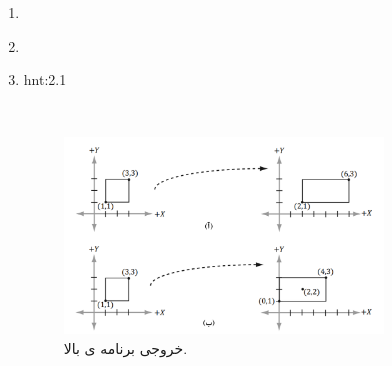 {\begin{spacing}{1.5}
\begin{enumerate}[label=\textbf{\arabic*}.]
            \item {
                 \textbf{\vspace{-6pt}}
            }

            \item {}

            \item {
                \begin{hint}{hnt:2.1}
                    \Large

                \end{hint} \\

                \begin{figure}[H]
                    \centering
                    \setlength{\belowcaptionskip}{-10pt}
                    \includegraphics[width=0.8\textwidth]{Images/4/3/4.Session.1.3.18}
                    \caption {خروجی برنامه ی بالا.}
                    \label{fig:4.Session.1.3.18}
                \end{figure}
            }
        \end{enumerate}
    \end{spacing}
}